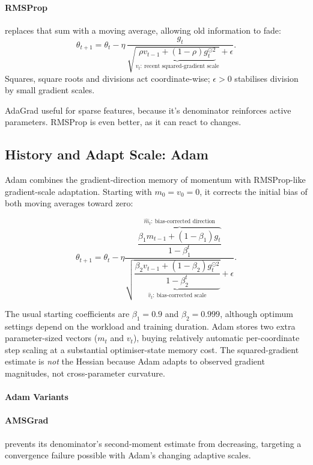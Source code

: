 \paragraph{RMSProp} replaces that sum with a moving average, allowing old information to fade:
\[
    \theta_{t+1}
    =
    \theta_t-\eta\,
    \frac{g_t}{
    \sqrt{\underbrace{\rho v_{t-1}+(1-\rho)g_t^{\odot2}}_{v_t:\ \text{recent squared-gradient scale}}}
    +\epsilon}.
\]
Squares, square roots and divisions act coordinate-wise; $\epsilon>0$ stabilises division by small gradient scales.

\begin{calloutmemoryhook}
    AdaGrad useful for sparse features, because it's denominator reinforces active parameters.
    RMSProp is even better, as it can react to changes.
\end{calloutmemoryhook}

\subsection{History and Adapt Scale: Adam}
\label{sec:optimisation-adam-momentum-plus-adaptive-step-sizes}
Adam combines the gradient-direction memory of momentum with RMSProp-like gradient-scale adaptation.
Starting with $m_0=v_0=0$, it corrects the initial bias of both moving averages toward zero:
\begin{calloutmemorise}
\[
    \theta_{t+1}=\theta_t-\eta
    \frac{
    \overbrace{
    \dfrac{\beta_1m_{t-1}+(1-\beta_1)g_t}{1-\beta_1^t}
    }^{\hat m_t:\ \text{bias-corrected direction}}
    }{
    \sqrt{\underbrace{
    \dfrac{\beta_2v_{t-1}+(1-\beta_2)g_t^{\odot2}}{1-\beta_2^t}
    }_{\hat v_t:\ \text{bias-corrected scale}}}
    +\epsilon
    }.
\]
\end{calloutmemorise}
The usual starting coefficients are $\beta_1=0.9$ and $\beta_2=0.999$, although optimum settings depend on the workload and training duration.
Adam stores two extra parameter-sized vectors ($m_t$ and $v_t$), buying relatively automatic per-coordinate step scaling at a substantial optimiser-state memory cost.
The squared-gradient estimate is \emph{not} the Hessian because Adam adapts to observed gradient magnitudes, not cross-parameter curvature.

\paragraph{Adam Variants}
\paragraph{AMSGrad} prevents its denominator's second-moment estimate from decreasing, targeting a convergence failure possible with Adam's changing adaptive scales.
